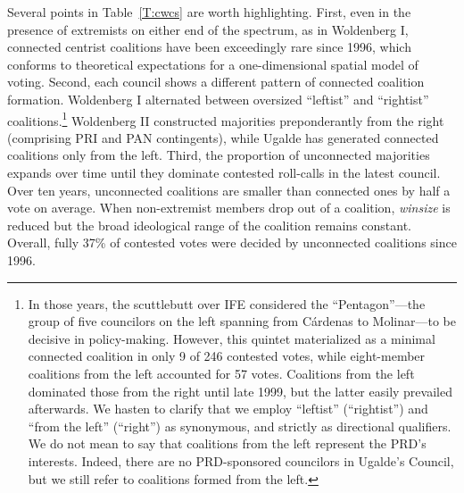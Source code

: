 \documentclass[12 pt, letter]{article}
\begin{document}
Several points in Table~\ref{T:cwcs} are worth highlighting.  First,
even in the presence of extremists on either end of the spectrum, as
in Woldenberg I, connected centrist coalitions have been exceedingly
rare since 1996, which conforms to theoretical expectations for a
one-dimensional spatial model of voting.  Second, each council shows
a different pattern of connected coalition formation.  Woldenberg I
alternated between oversized ``leftist'' and ``rightist''
coalitions.\footnote{In those years, the scuttlebutt over IFE
considered the ``Pentagon''---the group of five councilors on the
left spanning from C\'ardenas to Molinar---to be decisive in
policy-making.  However, this quintet materialized as a minimal
connected coalition in only 9 of 246 contested votes, while
eight-member coalitions from the left accounted for 57 votes.
Coalitions from the left dominated those from the right until late
1999, but the latter easily prevailed afterwards.  We hasten to
clarify that we employ ``leftist'' (``rightist'') and ``from the
left'' (``right'') as synonymous, and strictly as directional
qualifiers.  We do not mean to say that coalitions from the left
represent the PRD's interests.  Indeed, there are no PRD-sponsored
councilors in Ugalde's Council, but we still refer to coalitions
formed from the left.}  Woldenberg II constructed majorities
preponderantly from the right (comprising PRI and PAN contingents),
while Ugalde has generated connected coalitions only from the left.
Third, the proportion of unconnected majorities expands over time
until they dominate contested roll-calls in the latest council.
Over ten years, unconnected coalitions are smaller than connected
ones by half a vote on average.  When non-extremist members drop out
of a coalition, \emph{winsize} is reduced but the broad ideological
range of the coalition remains constant.  Overall, fully 37\% of
contested votes were decided by unconnected coalitions since 1996.
\end{document}
